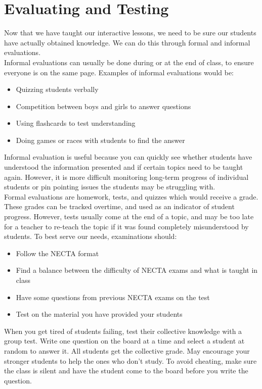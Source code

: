 \chapter{Evaluating and Testing}
Now that we have taught our interactive lessons, we need to be sure our students have actually obtained knowledge.  We can do this through formal and informal evaluations.\\
  
Informal evaluations can usually be done during or at the end of class, to ensure everyone is on the same page.  Examples of informal evaluations would be:

\begin{itemize}
 \item Quizzing students verbally
 \item Competition between boys and girls to answer questions
 \item Using flashcards to test understanding
 \item Doing games or races with students to find the answer
\end{itemize}

Informal evaluation is useful because you can quickly see whether students have understood the information presented and if certain topics need to be taught again.  However, it is more difficult monitoring long-term progress of individual students or pin pointing issues the students may be struggling with.\\

Formal evaluations are homework, tests, and quizzes which would receive a grade.  These grades can be tracked overtime, and used as an indicator of student progress.  However, tests usually come at the end of a topic, and may be too late for a teacher to re-teach the topic if it was found completely misunderstood by students. To best serve our needs, examinations should:

\begin{itemize}
 \item Follow the NECTA format
 \item Find a balance between the difficulty of NECTA exams and what is taught in class
 \item Have some questions from previous NECTA  exams on the test
 \item Test on the material you have provided your students
\end{itemize}

When you get tired of students failing, test their collective knowledge with a group test.  Write one question on the board at a time and select a student at random to answer it.  All students get the collective grade.  May encourage your stronger students to help the ones who don't study.  To avoid cheating, make sure the class is silent and have the student come to the board before you write the question.\\


